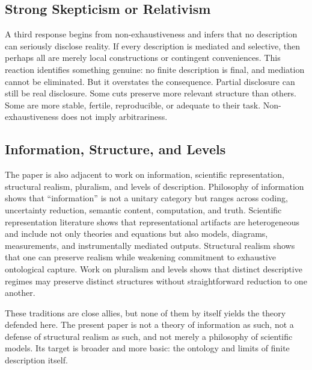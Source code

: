 \documentclass[11pt]{article}
\begin{document}
\subsection{Strong Skepticism or Relativism}

A third response begins from non-exhaustiveness and infers that no description can seriously disclose reality. If every description is mediated and selective, then perhaps all are merely local constructions or contingent conveniences. This reaction identifies something genuine: no finite description is final, and mediation cannot be eliminated. But it overstates the consequence. Partial disclosure can still be real disclosure. Some cuts preserve more relevant structure than others. Some are more stable, fertile, reproducible, or adequate to their task. Non-exhaustiveness does not imply arbitrariness. \cite{chakravartty_scientific_realism_sep,ladyman_structural_realism_sep,scientific_pluralism_sep}

\subsection{Information, Structure, and Levels}

The paper is also adjacent to work on information, scientific representation, structural realism, pluralism, and levels of description. Philosophy of information shows that ``information'' is not a unitary category but ranges across coding, uncertainty reduction, semantic content, computation, and truth. Scientific representation literature shows that representational artifacts are heterogeneous and include not only theories and equations but also models, diagrams, measurements, and instrumentally mediated outputs. Structural realism shows that one can preserve realism while weakening commitment to exhaustive ontological capture. Work on pluralism and levels shows that distinct descriptive regimes may preserve distinct structures without straightforward reduction to one another. \cite{adriaans_information_sep,frigg_nguyen_scientific_representation_sep,ladyman_structural_realism_sep,scientific_pluralism_sep,levels_org_biology_sep}

These traditions are close allies, but none of them by itself yields the theory defended here. The present paper is not a theory of information as such, not a defense of structural realism as such, and not merely a philosophy of scientific models. Its target is broader and more basic: the ontology and limits of finite description itself.
\end{document}
